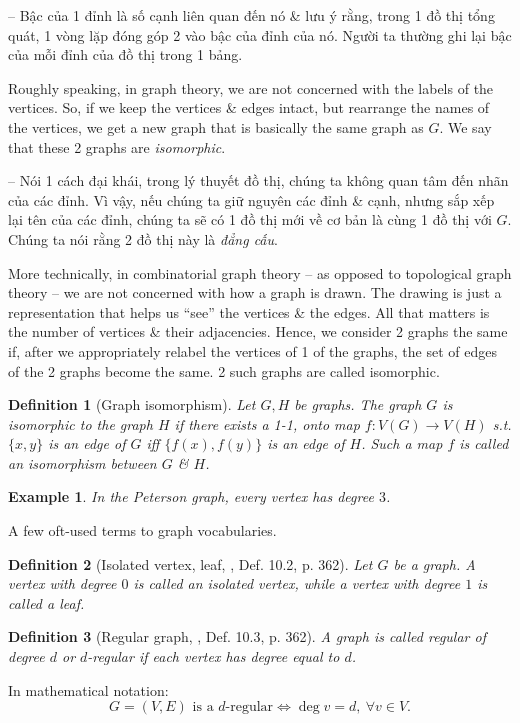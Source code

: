 \documentclass[oneside]{book}
\newtheorem{definition}{Definition}
\newtheorem{example}{Example}
\begin{document}
-- Bậc của 1 đỉnh là số cạnh liên quan đến nó \& lưu ý rằng, trong 1 đồ thị tổng quát, 1 vòng lặp đóng góp 2 vào bậc của đỉnh của nó. Người ta thường ghi lại bậc của mỗi đỉnh của đồ thị trong 1 bảng.

Roughly speaking, in graph theory, we are not concerned with the labels of the vertices. So, if we keep the vertices \& edges intact, but rearrange the names of the vertices, we get a new graph that is basically the same graph as $G$. We say that these 2 graphs are {\it isomorphic}.

-- Nói 1 cách đại khái, trong lý thuyết đồ thị, chúng ta không quan tâm đến nhãn của các đỉnh. Vì vậy, nếu chúng ta giữ nguyên các đỉnh \& cạnh, nhưng sắp xếp lại tên của các đỉnh, chúng ta sẽ có 1 đồ thị mới về cơ bản là cùng 1 đồ thị với $G$. Chúng ta nói rằng 2 đồ thị này là {\it đẳng cấu}.

More technically, in combinatorial graph theory -- as opposed to topological graph theory -- we are not concerned with how a graph is drawn. The drawing is just a representation that helps us ``see'' the vertices \& the edges. All that matters is the number of vertices \& their adjacencies. Hence, we consider 2 graphs the same if, after we appropriately relabel the vertices of 1 of the graphs, the set of edges of the 2 graphs become the same. 2 such graphs are called isomorphic.

\begin{definition}[Graph isomorphism]
	Let $G,H$ be graphs. The graph $G$ is {\rm isomorphic} to the graph $H$ if there exists a 1-1, onto map $f:V(G)\to V(H)$ s.t. $\{x,y\}$ is an edge of $G$ iff $\{f(x),f(y)\}$ is an edge of $H$. Such a map $f$ is called an {\rm  isomorphism} between $G$ \& $H$.
\end{definition}

\begin{example}
	In the Peterson graph, every vertex has degree $3$.
\end{example}
A few oft-used terms to graph vocabularies.

\begin{definition}[Isolated vertex, leaf, \cite{Shahriari2022}, Def. 10.2, p. 362]
	Let $G$ be a graph. A vertex with degree $0$ is called an {\rm isolated vertex}, while a vertex with degree $1$ is called a {\rm leaf}.
\end{definition}

\begin{definition}[Regular graph, \cite{Shahriari2022}, Def. 10.3, p. 362]
	A graph is called {\rm regular of degree $d$} or {\rm$d$-regular} if each vertex has degree equal to $d$.
\end{definition}
In mathematical notation:
\begin{equation*}
	G = (V,E)\mbox{ is a } d\mbox{-regular}\Leftrightarrow\deg v = d,\ \forall v\in V.
\end{equation*}
\end{document}
